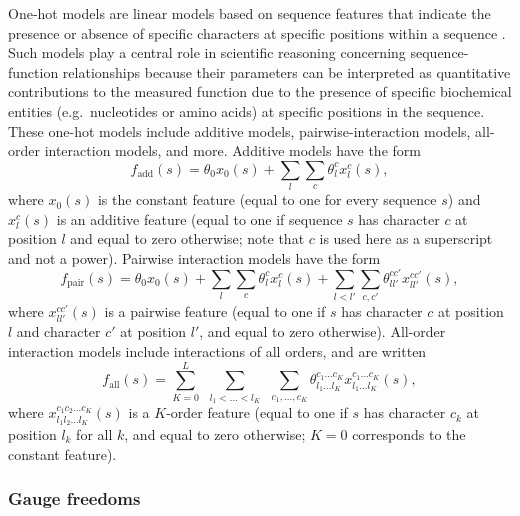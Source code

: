 \documentclass[10pt,letterpaper]{article}
\begin{document}
One-hot models are linear models based on sequence features that indicate the presence or absence of specific characters at specific positions within a sequence \cite{Kinney:2019jc}. Such models play a central role in scientific reasoning concerning sequence-function relationships because their parameters can be interpreted as quantitative contributions to the measured function due to the presence of specific biochemical entities (e.g.~nucleotides or amino acids) at specific positions in the sequence. These one-hot models include additive models, pairwise-interaction models, all-order interaction models, and more. Additive models have the form 
\begin{equation}
    f_\mathrm{add}(s) = \theta_0 x_0(s) + \sum_l \sum_c \theta_l^c x_l^c(s), \label{eq:additive}
\end{equation}
where $x_0(s)$ is the constant feature (equal to one for every sequence $s$) and $x_l^c(s)$ is an additive feature (equal to one if sequence $s$ has character $c$ at position $l$ and equal to zero otherwise; note that $c$ is used here as a superscript and not a power). Pairwise interaction models have the form 
\begin{equation}
    f_\mathrm{pair}(s) = \theta_0 x_0(s) + \sum_l \sum_c \theta_l^c x_l^c(s) + \sum_{l < l'} \sum_{c, c'}  \theta_{ll'}^{cc'} x_{ll'}^{cc'}(s), \label{eq:pairwise}
\end{equation}
where $x_{ll'}^{cc'}(s)$ is a pairwise feature (equal to one if $s$ has character $c$ at position $l$ and character $c'$ at position $l'$, and equal to zero otherwise). All-order interaction models include interactions of all orders, and are written
\begin{equation}
    f_\mathrm{all}(s) = \sum_{K=0}^L ~~\sum_{l_1 < \ldots < l_K}~~\sum_{c_1, \ldots, c_K}\theta_{l_1 \ldots l_K}^{c_1 \ldots c_K} x_{l_1 \ldots l_K}^{c_1 \ldots c_K}(s), \label{eq:all_order}
\end{equation}
where $x_{l_1 l_2 \ldots l_K}^{c_1 c_2 \ldots c_K}(s)$ is a $K$-order feature (equal to one if $s$ has character $c_k$ at position $l_k$ for all $k$, and equal to zero otherwise; $K=0$ corresponds to the constant feature).


\subsubsection*{Gauge freedoms} 
\end{document}

